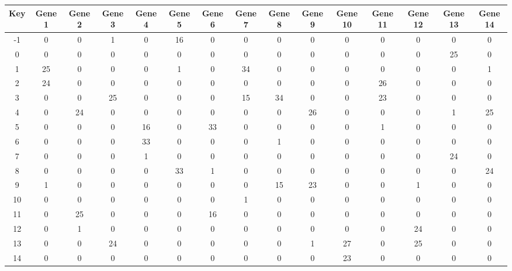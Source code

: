 \begin{tabular}{|c|c|c|c|c|c|c|c|c|c|c|c|c|c|c|}
\hline
Key & Gene 1 & Gene 2 & Gene 3 & Gene 4 & Gene 5 & Gene 6 & Gene 7 & Gene 8 & Gene 9 & Gene 10 & Gene 11 & Gene 12 & Gene 13 & Gene 14 \\
\hline
-1 & 0 & 0 & 1 & 0 & 16 & 0 & 0 & 0 & 0 & 0 & 0 & 0 & 0 & 0 \\
0 & 0 & 0 & 0 & 0 & 0 & 0 & 0 & 0 & 0 & 0 & 0 & 0 & 25 & 0 \\
1 & 25 & 0 & 0 & 0 & 1 & 0 & 34 & 0 & 0 & 0 & 0 & 0 & 0 & 1 \\
2 & 24 & 0 & 0 & 0 & 0 & 0 & 0 & 0 & 0 & 0 & 26 & 0 & 0 & 0 \\
3 & 0 & 0 & 25 & 0 & 0 & 0 & 15 & 34 & 0 & 0 & 23 & 0 & 0 & 0 \\
4 & 0 & 24 & 0 & 0 & 0 & 0 & 0 & 0 & 26 & 0 & 0 & 0 & 1 & 25 \\
5 & 0 & 0 & 0 & 16 & 0 & 33 & 0 & 0 & 0 & 0 & 1 & 0 & 0 & 0 \\
6 & 0 & 0 & 0 & 33 & 0 & 0 & 0 & 1 & 0 & 0 & 0 & 0 & 0 & 0 \\
7 & 0 & 0 & 0 & 1 & 0 & 0 & 0 & 0 & 0 & 0 & 0 & 0 & 24 & 0 \\
8 & 0 & 0 & 0 & 0 & 33 & 1 & 0 & 0 & 0 & 0 & 0 & 0 & 0 & 24 \\
9 & 1 & 0 & 0 & 0 & 0 & 0 & 0 & 15 & 23 & 0 & 0 & 1 & 0 & 0 \\
10 & 0 & 0 & 0 & 0 & 0 & 0 & 1 & 0 & 0 & 0 & 0 & 0 & 0 & 0 \\
11 & 0 & 25 & 0 & 0 & 0 & 16 & 0 & 0 & 0 & 0 & 0 & 0 & 0 & 0 \\
12 & 0 & 1 & 0 & 0 & 0 & 0 & 0 & 0 & 0 & 0 & 0 & 24 & 0 & 0 \\
13 & 0 & 0 & 24 & 0 & 0 & 0 & 0 & 0 & 1 & 27 & 0 & 25 & 0 & 0 \\
14 & 0 & 0 & 0 & 0 & 0 & 0 & 0 & 0 & 0 & 23 & 0 & 0 & 0 & 0 \\
\hline
\end{tabular}